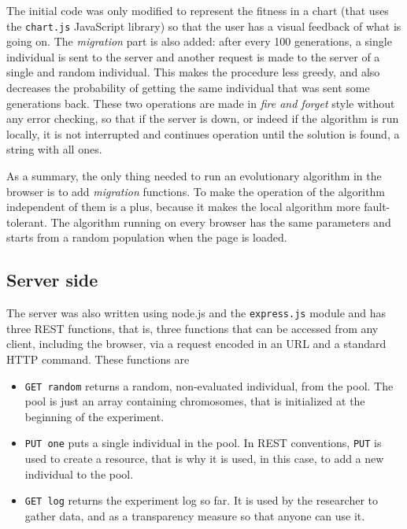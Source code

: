 \documentclass{sig-alternate}
\begin{document}
The initial code was only modified to represent the fitness in a chart
(that uses the {\tt chart.js} JavaScript library) so that the user has
a visual feedback of what is going on. The {\em migration} part is
also added: after every 100 generations, a single individual is sent
to the server and another request is made to the server of a single
and random individual. This makes the procedure less greedy, and also
decreases the probability of getting the same individual that was sent
some generations back. These two operations are made in {\em fire and
  forget} style without any error checking, so that if the server is
down, or indeed if the algorithm is run locally, it is not interrupted
and continues operation until the solution is found, a string with all
ones.  

As a summary, the only thing needed to run an evolutionary algorithm
in the browser is to add {\em migration} functions. To make the
operation of the algorithm independent of them is a plus, because it
makes the local algorithm more fault-tolerant. The algorithm running
on every browser has the same parameters and starts from a random
population when the page is loaded.

\subsection{Server side}
\label{ss:server} 

The server was also written using node.js and the {\tt express.js}
module and has three REST \cite{Castillo12REST} %
functions, that is, three functions that can be accessed from any
client, including the browser, via a request encoded in an URL and a
standard HTTP command. These functions are\begin{itemize}
\item {\tt GET random} returns a random, non-evaluated individual,
  from the pool. The pool is just an array containing chromosomes,
  that is initialized at the beginning of the experiment.
\item {\tt PUT one} puts a single individual in the pool. In REST
  conventions, {\tt PUT} is used to create a resource, that is why it
  is used, in this case, to add a new individual to the pool.
\item {\tt GET log} returns the experiment log so far. It is used by
  the researcher to gather data, and as a transparency measure so that
  anyone can use it. 
\end{itemize}
\end{document}
